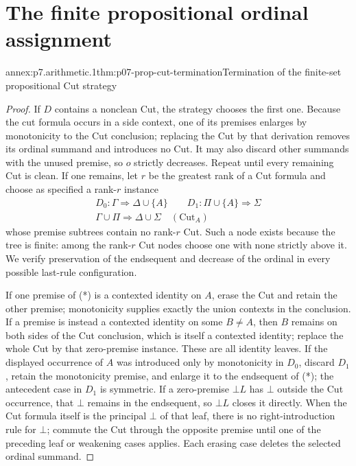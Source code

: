 
\section{The finite propositional ordinal assignment}

\begin{annexitem}{annex:p7.arithmetic.1}{thm:p07-prop-cut-termination}{Termination of the finite-set propositional Cut strategy}
\begin{proof}
If \(D\) contains a nonclean Cut, the strategy chooses the first one.  Because
the cut formula occurs in a side context, one of its premises enlarges by
monotonicity to the Cut conclusion; replacing the Cut by that derivation
removes its ordinal summand and introduces no Cut.  It may also discard other
summands with the unused premise, so \(o\) strictly decreases.  Repeat until
every remaining Cut is clean.  If one remains, let \(r\) be the greatest rank
of a Cut formula and choose as specified a rank-\(r\) instance
\[
 \begin{array}{c}
 D_0:\Gamma\Rightarrow\Delta\cup\{A\}
 \qquad
 D_1:\Pi\cup\{A\}\Rightarrow\Sigma\\[-2pt]
 \hline
 \Gamma\cup\Pi\Rightarrow\Delta\cup\Sigma\quad(\mathrm{Cut}_A)
 \end{array}
 \tag{*}
\]
whose premise subtrees contain no rank-\(r\) Cut.  Such a node exists because
the tree is finite: among the rank-\(r\) Cut nodes choose one with none strictly
above it.  We verify preservation of the endsequent and decrease of the
ordinal in every possible last-rule configuration.

If one premise of (*) is a contexted identity on \(A\), erase the Cut and
retain the other premise; monotonicity supplies exactly the union contexts in
the conclusion.  If a premise is instead a contexted identity on some
\(B\ne A\), then \(B\) remains on both sides of the Cut conclusion, which is
itself a contexted identity; replace the whole Cut by that zero-premise
instance.  These are all identity leaves.  If the displayed occurrence of \(A\) was introduced only by
monotonicity in \(D_0\), discard \(D_1\), retain the monotonicity premise, and
enlarge it to the endsequent of (*); the antecedent case in \(D_1\) is
symmetric.  If a zero-premise \(\bot L\) has \(\bot\) outside the Cut
occurrence, that \(\bot\) remains in the endsequent, so \(\bot L\) closes it
directly.  When the Cut formula itself is the principal \(\bot\) of that leaf,
there is no right-introduction rule for \(\bot\); commute the Cut through the
opposite premise until one of the preceding leaf or weakening cases applies.
Each erasing case deletes the selected ordinal summand.


\end{proof}
\end{annexitem}
